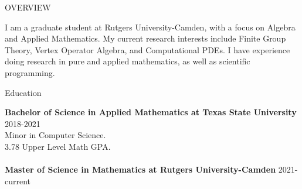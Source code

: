 \documentclass{resume} %
\begin{document}

\begin{rSection}{OVERVIEW}

{
I am a graduate student at Rutgers University-Camden, with a focus on Algebra and Applied Mathematics.
My current research interests include Finite Group Theory, Vertex Operator Algebra, and Computational PDEs.
I have experience doing research in pure and applied mathematics, as well as scientific programming.
}


\end{rSection}

\begin{rSection}{Education}

{\bf Bachelor of Science in Applied Mathematics at Texas State University} \hfill {2018-2021}
\\ 
Minor in Computer Science.
\\
3.78 Upper Level Math GPA.
\\
\\
{\bf Master of Science in Mathematics at Rutgers University-Camden} \hfill {2021-current}


\end{rSection}


\end{document}
